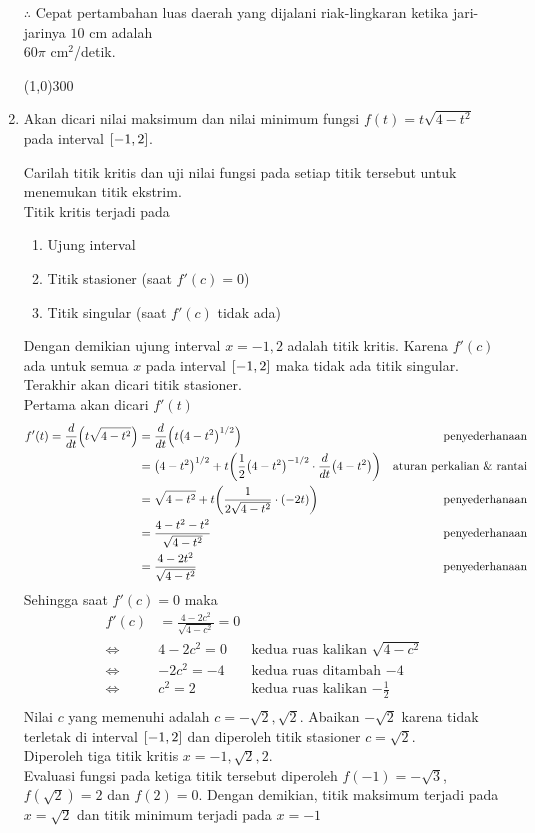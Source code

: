 \begin{enumerate}[leftmargin=*, label={\arabic*}.]
$\therefore$ Cepat pertambahan luas daerah yang dijalani riak-lingkaran ketika 
jari-jarinya $10$ cm adalah \\
$60\pi$ cm$^{2}$/detik.


\begin{center}\line(1,0){300}\end{center}


\item 
Akan dicari nilai maksimum dan nilai minimum fungsi $f(t)=t\sqrt{4-t^{2}}$ pada 
interval $\cic*{-1,2}$.

Carilah titik kritis dan uji nilai fungsi pada setiap titik tersebut untuk menemukan 
titik ekstrim.\\
Titik kritis terjadi pada
    \begin{enumerate}[label={\arabic*})]
    \item Ujung interval
    \item Titik stasioner (saat $f'(c)=0$)
    \item Titik singular (saat $f'(c)$ tidak ada)
    \end{enumerate}
Dengan demikian ujung interval $x=-1,2$ adalah titik kritis. Karena $f'(c)$ ada 
untuk semua $x$ pada interval $\cic*{-1,2}$ maka tidak ada titik singular. Terakhir akan 
dicari titik stasioner.\\
Pertama akan dicari $f'(t)$ 
\begin{align*}
    f'(t) = \drv{t}{t\sqrt{4-t^{2}}} 
    &= \drv{t}{t\brk*{4-t^{2}}^{1/2}}
    &\text{penyederhanaan}\\
    &= \brk*{4-t^2}^{1/2}+t\brk*{\frac{1}{2}\brk*{4-t^{2}}^{-1/2}\cdot\drv{t}{4-t^{2}}}
    &\text{aturan perkalian \& rantai}\\
    &= \sqrt{4-t^{2}}+t\brk*{\frac{1}{2\sqrt{4-t^{2}}}\cdot (-2t)}
    &\text{penyederhanaan}\\
    &= \frac{4-t^{2}-t^{2}}{\sqrt{4-t^{2}}}
    &\text{penyederhanaan}\\
    &= \frac{4-2t^{2}}{\sqrt{4-t^{2}}}
    &\text{penyederhanaan}
\end{align*}
Sehingga saat $f'(c)=0$ maka
\begin{align*}
    f'(c) &= \frac{4-2c^{2}}{\sqrt{4-c^{2}}} = 0\\
    \iff &4-2c^{2} = 0
    &\text{kedua ruas kalikan $\sqrt{4-c^{2}}$}\\
    \iff &-2c^{2} = -4
    &\text{kedua ruas ditambah $-4$}\\
    \iff &c^2 = 2
    &\text{kedua ruas kalikan $-\frac{1}{2}$}\\
\end{align*}
Nilai $c$ yang memenuhi adalah $c=-\sqrt{2}, \sqrt{2}$. Abaikan $-\sqrt{2}$ karena 
tidak terletak di interval $\cic{-1,2}$ dan diperoleh titik stasioner 
$c = \sqrt{2}$.\\
Diperoleh tiga titik kritis $x = -1,\sqrt{2},2$.\\
Evaluasi fungsi pada ketiga titik tersebut diperoleh $f(-1) = -\sqrt{3}$, 
$f(\sqrt{2})=2$ dan $f(2) = 0$. Dengan demikian, titik maksimum terjadi pada 
$x = \sqrt{2}$ dan titik minimum terjadi pada $x = -1$


\end{enumerate}

